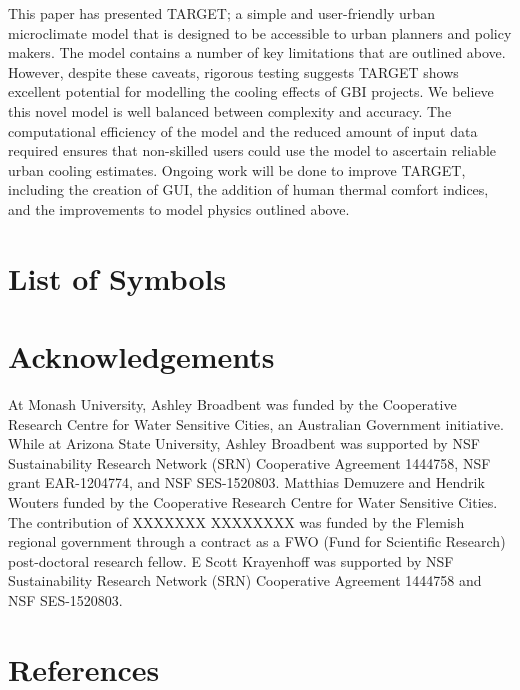 \documentclass[journal abbreviation, manuscript]{copernicus}
\begin{document}
This paper has presented TARGET; a simple and user-friendly urban microclimate model that is designed to be accessible to urban planners and policy makers. The model contains a number of key limitations that are outlined above. However, despite these caveats, rigorous testing suggests TARGET shows excellent potential for modelling the cooling effects of GBI projects. We believe this novel model is well balanced between  complexity and accuracy. The computational efficiency of the model and the reduced amount of input data required ensures that non-skilled users could use the model to ascertain reliable urban cooling estimates. Ongoing work will be done to improve TARGET, including the creation of GUI, the addition of human thermal comfort indices, and the improvements to model physics outlined above. 




\section{List of Symbols}\label{sec:symbollist}   



\section*{Acknowledgements}
At Monash University, Ashley Broadbent was funded by the Cooperative Research Centre for Water Sensitive Cities, an Australian Government initiative. While at Arizona State University, Ashley Broadbent was supported by NSF Sustainability Research Network (SRN) Cooperative Agreement 1444758,  NSF grant EAR-1204774, and NSF SES-1520803. Matthias Demuzere and Hendrik Wouters funded by the Cooperative Research Centre for Water Sensitive Cities. The contribution of XXXXXXX XXXXXXXX was funded by the Flemish regional government through a contract as a FWO (Fund for Scientific Research) post-doctoral research fellow. E Scott Krayenhoff  was supported by NSF Sustainability Research Network (SRN) Cooperative Agreement 1444758 and NSF SES-1520803. 


\section*{References}\label{sec:ref}


  


\end{document}
